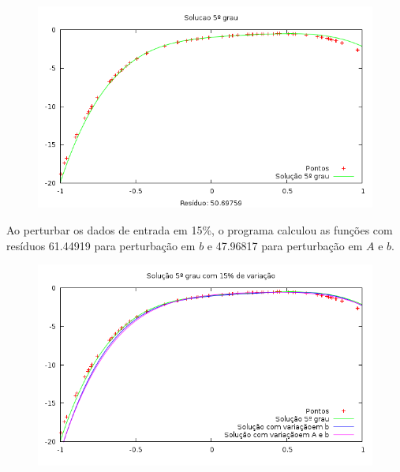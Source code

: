 \begin{figure}[h]
\centering
\includegraphics[scale=0.7]{sol5grau}
\end{figure}
Ao perturbar os dados de entrada em 15\%, o programa calculou as funções 
com resíduos 61.44919  para perturbação em $b$ e 47.96817 para perturbação em $A$ e $b$.
\begin{figure}[h]
\centering
\includegraphics[scale=0.7]{sol5grau_var}
\end{figure}

